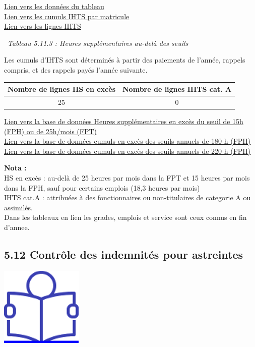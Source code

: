 \href{../Bases/Reglementation/CumHS.csv}{Lien vers les données du
tableau}\\
\href{../Bases/Reglementation/lignes.IHTS.tot.csv}{Lien vers les cumuls
IHTS par matricule}\\
\href{../Bases/Reglementation/lignes.IHTS.csv}{Lien vers les lignes IHTS}

~\emph{Tableau 5.11.3 : Heures supplémentaires au-delà des seuils}

Les cumuls d'IHTS sont déterminés à partir des paiements de l'année,
rappels compris, et des rappels payés l'année suivante.

\begin{longtable}[]{@{}cc@{}}
\toprule
Nombre de lignes HS en excès & Nombre de lignes IHTS cat.
A\tabularnewline
\midrule
\endhead
25 & 0\tabularnewline
\bottomrule
\end{longtable}

\href{../Bases/Reglementation/HS.sup.25.csv}{Lien vers la base de données
Heures supplémentaires en excès du seuil de 15h (FPH) ou de 25h/mois
(FPT)}\\
\href{../Bases/Reglementation/Depassement.seuil.180h.csv}{Lien vers la base
de données cumuls en excès des seuils annuels de 180 h (FPH)}\\
\href{../Bases/Reglementation/Depassement.seuil.220h.csv}{Lien vers la base
de données cumuls en excès des seuils annuels de 220 h (FPH)}

\textbf{Nota :}\\
HS en excès : au-delà de 25 heures par mois dans la FPT et 15 heures par
mois dans la FPH, sauf pour certains emplois (18,3 heures par mois)\\
IHTS cat.A : attribuées à des fonctionnaires ou non-titulaires de
categorie A ou assimilés.\\
Dans les tableaux en lien les grades, emplois et service sont ceux
connus en fin d'annee.

\hypertarget{controle-des-indemnites-pour-astreintes}{%
\subsection{5.12 Contrôle des indemnités pour
astreintes}\label{controle-des-indemnites-pour-astreintes}}

\href{../Docs/Notices/fiche_astreintes.odt}{\includegraphics{icones/Notice.png}}

